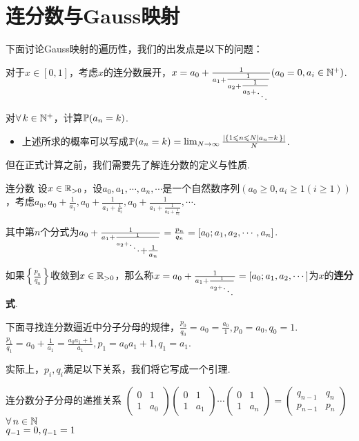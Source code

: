 \section{连分数与Gauss映射}
下面讨论Gauss映射的遍历性，我们的出发点是以下的问题：
\begin{question}
    对于$x\in [0,1]$，考虑$x$的连分数展开，$x=a_0+\frac{1}{a_1+\tfrac{1}{a_2+\tfrac{1}{a_3+\raisebox{-.5\height}{$\ddots$}}}}(a_0=0,a_i\in\mb{N}^+)$.\par
    对$\forall\, k\in\mathbb{N}^+$，计算$\mathbb{P}(a_n=k)$.
    \begin{itemize}
        \item 上述所求的概率可以写成$\mathbb{P}(a_n=k)=\lim_{N\to\infty}{\frac{\left|\left\{1\leqslant n\leqslant N\left|a_n=k\right.\right\}\right|}{N}}$.
    \end{itemize}
\end{question}
    但在正式计算之前，我们需要先了解连分数的定义与性质.\par
    \begin{definition}{连分数}
        \wideline
        设$x\in\mathbb{R}_{>0}$，设$a_0,a_1,\cdots,a_n,\cdots$是一个自然数序列$(a_0\geq 0,a_i\geq 1(i\geq 1))$，考虑$a_0,a_0+\frac{1}{a_1},a_0+\frac{1}{a_1+\frac{1}{a_2}},a_0+\frac{1}{a_1+\frac{1}{a_2+\frac{1}{a_3}}},\cdots$.\par
        其中第$n$个分式为$a_0+\frac{1}{a_1+\frac{1}{a_2+\raisebox{-.5\height}{$\ddots$}\raisebox{-1\height}{$+\tfrac{1}{a_n}$}}}=\frac{p_n}{q_n}=[a_0;a_1,a_2,\cdots,a_n]$.\par
        如果$\left\{\frac{p_n}{q_n}\right\}$收敛到$x\in\mathbb{R}_{>0}$，那么称$x=a_0+\frac{1}{a_1+\frac{1}{a_2+\raisebox{-.5\height}{$\ddots$}}}=[a_0;a_1,a_2,\cdots]$为$x$的\textbf{连分式}.\par
    \end{definition}
    下面寻找连分数逼近中分子分母的规律，$\frac{p_0}{q_0}=a_0=\frac{a_0}{1},p_0=a_0,q_0=1$.$\frac{p_1}{q_1}=a_0+\frac{1}{a_1}=\frac{a_0a_1+1}{a_1},p_1=a_0a_1+1,q_1=a_1$.\par
    实际上，$p_i,q_i$满足以下关系，我们将它写成一个引理.
    \begin{lemma}{连分数分子分母的递推关系}
        $\begin{pmatrix}
            0 & 1 \\
            1 & a_0 
        \end{pmatrix}\begin{pmatrix}
            0 & 1 \\
            1 & a_1
        \end{pmatrix}\cdots\begin{pmatrix}
            0 & 1 \\
            1 & a_n
        \end{pmatrix}=\begin{pmatrix}
            q_{n-1} & q_n \\
            p_{n-1} & p_n
        \end{pmatrix}$$\setjot[-3]\begin{aligned}
            &\forall\, n\in\mb{N} \\
            &q_{-1}=0,q_{-1}=1 \\
        \end{aligned}$
    \end{lemma}
